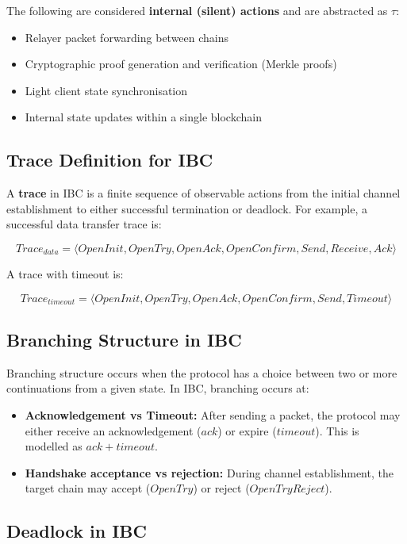 The following are considered \textbf{internal (silent) actions} and are
abstracted as \(\tau\):

\begin{itemize}
    \item Relayer packet forwarding between chains
    \item Cryptographic proof generation and verification (Merkle proofs)
    \item Light client state synchronisation
    \item Internal state updates within a single blockchain
\end{itemize}

\subsection{Trace Definition for IBC}\label{trace-definition-for-ibc}

A \textbf{trace} in IBC is a finite sequence of observable actions from
the initial channel establishment to either successful termination or
deadlock. For example, a successful data transfer trace is:

\[
Trace_{data} = \langle OpenInit, OpenTry, OpenAck, OpenConfirm, Send, Receive, Ack \rangle
\]

A trace with timeout is:

\[
Trace_{timeout} = \langle OpenInit, OpenTry, OpenAck, OpenConfirm, Send, Timeout \rangle
\]

\subsection{Branching Structure in
IBC}\label{branching-structure-in-ibc}

Branching structure occurs when the protocol has a choice between two or
more continuations from a given state. In IBC, branching occurs at:

\begin{itemize}
    \item \textbf{Acknowledgement vs Timeout:} After sending a packet, the protocol may either receive an acknowledgement (\(ack\)) or expire (\(timeout\)). This is modelled as \(ack + timeout\).
    \item \textbf{Handshake acceptance vs rejection:} During channel establishment, the target chain may accept (\(OpenTry\)) or reject (\(OpenTryReject\)).
\end{itemize}

\subsection{Deadlock in IBC}\label{deadlock-in-ibc}

